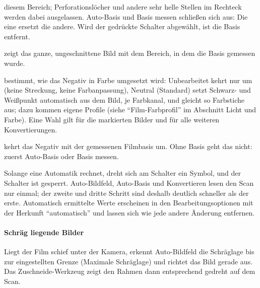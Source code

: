 \documentclass[a4paper,11pt,parskip=half,DIV=12]{scrartcl}
\newcommand{\menu}[1]{\textsf{#1}}                    %
\begin{document}
\begin{description}
        diesem Bereich; Perforationslöcher und andere sehr helle Stellen im Rechteck werden
        dabei ausgelassen. \menu{Auto-Basis} und \menu{Basis messen} schließen sich aus: Die
        eine ersetzt die andere. Wird der gedrückte Schalter abgewählt, ist die Basis entfernt.
  \item[Messbereich anzeigen] zeigt das ganze, ungeschnittene Bild mit dem Bereich, in dem
        die Basis gemessen wurde.
  \item[Film-Farbprofil] bestimmt, wie das Negativ in Farbe umgesetzt wird:
        \menu{Unbearbeitet} kehrt nur um (keine Streckung, keine Farbanpassung),
        \menu{Neutral} (Standard) setzt Schwarz- und Weißpunkt automatisch aus dem Bild, je
        Farbkanal, und gleicht so Farbstiche aus; dazu kommen eigene Profile (siehe \enquote{Film-Farbprofil} im
        Abschnitt Licht und Farbe). Eine Wahl gilt für die markierten Bilder und für alle
        weiteren Konvertierungen.
  \item[Konvertieren] kehrt das Negativ mit der gemessenen Filmbasis um. Ohne Basis geht das
        nicht: zuerst \menu{Auto-Basis} oder \menu{Basis messen}.
\end{description}
Solange eine Automatik rechnet, dreht sich am Schalter ein Symbol, und der Schalter ist
gesperrt. Auto-Bildfeld, Auto-Basis und Konvertieren lesen den Scan nur einmal; der zweite und
dritte Schritt sind deshalb deutlich schneller als der erste.
Automatisch ermittelte Werte erscheinen in den Bearbeitungsoptionen mit der Herkunft
\enquote{automatisch} und lassen sich wie jede andere Änderung entfernen.

\paragraph{Schräg liegende Bilder} Liegt der Film schief unter der Kamera, erkennt
\menu{Auto-Bildfeld} die Schräglage bis zur eingestellten Grenze (\menu{Maximale Schräglage}) und
richtet das Bild gerade aus. Das Zuschneide-Werkzeug zeigt den Rahmen dann entsprechend gedreht
auf dem Scan.
\end{document}
